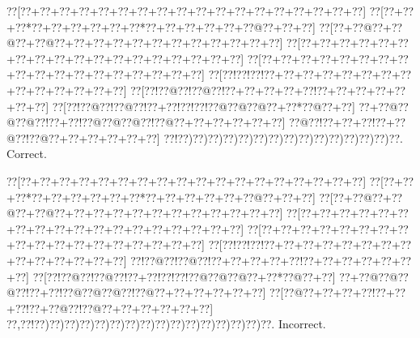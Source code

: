 \documentclass[a5paper]{article}
\begin{document}
\begin{center}
{\goo
\0??[\0??+\0??+\0??+\0??+\0??+\0??+\0??+\0??+\0??+\0??+\0??+\0??+\0??+\0??+\0??+\0??+\0??+\0??]
\0??[\0??+\0??+\0??*\0??+\0??+\0??+\0??+\0??+\0??*\0??+\0??+\0??+\0??+\0??+\0??@\0??+\0??+\0??]
\0??[\0??+\0??@\0??+\0??@\0??+\0??@\0??+\0??+\0??+\0??+\0??+\0??+\0??+\0??+\0??+\0??+\0??+\0??]
\0??[\0??+\0??+\0??+\0??+\0??+\0??+\0??+\0??+\0??+\0??+\0??+\0??+\0??+\0??+\0??+\0??+\0??+\0??]
\0??[\0??+\0??+\0??+\0??+\0??+\0??+\0??+\0??+\0??+\0??+\0??+\0??+\0??+\0??+\0??+\0??+\0??+\0??]
\0??[\0??!\0??!\0??!\0??+\0??+\0??+\0??+\0??+\0??+\0??+\0??+\0??+\0??+\0??+\0??+\0??+\0??]
\0??[\0??!\0??@\0??!\0??@\0??!\0??+\0??+\0??+\0??+\0??!\0??+\0??+\0??+\0??+\0??+\0??+\0??]
\0??[\0??!\0??@\0??!\0??@\0??!\0??+\0??!\0??!\0??!\0??@\0??@\0??@\0??+\0??*\0??@\0??+\0??]
\0??+\0??@\0??@\0??@\0??!\0??+\0??!\0??@\0??@\0??@\0??!\0??@\0??+\0??+\0??+\0??+\0??+\0??]
\0??@\0??!\0??+\0??+\0??!\0??+\0??@\0??!\0??@\0??+\0??+\0??+\0??+\0??+\0??]
\0??!\0??)\0??)\0??)\0??)\0??)\0??)\0??)\0??)\0??)\0??)\0??)\0??)\0??)\0??)\0??.
}
Correct. 

\end{center}
\begin{center}
{\goo
\0??[\0??+\0??+\0??+\0??+\0??+\0??+\0??+\0??+\0??+\0??+\0??+\0??+\0??+\0??+\0??+\0??+\0??+\0??]
\0??[\0??+\0??+\0??*\0??+\0??+\0??+\0??+\0??+\0??*\0??+\0??+\0??+\0??+\0??+\0??@\0??+\0??+\0??]
\0??[\0??+\0??@\0??+\0??@\0??+\0??@\0??+\0??+\0??+\0??+\0??+\0??+\0??+\0??+\0??+\0??+\0??+\0??]
\0??[\0??+\0??+\0??+\0??+\0??+\0??+\0??+\0??+\0??+\0??+\0??+\0??+\0??+\0??+\0??+\0??+\0??+\0??]
\0??[\0??+\0??+\0??+\0??+\0??+\0??+\0??+\0??+\0??+\0??+\0??+\0??+\0??+\0??+\0??+\0??+\0??+\0??]
\0??[\0??!\0??!\0??!\0??+\0??+\0??+\0??+\0??+\0??+\0??+\0??+\0??+\0??+\0??+\0??+\0??+\0??]
\0??!\0??@\0??!\0??@\0??!\0??+\0??+\0??+\0??+\0??!\0??+\0??+\0??+\0??+\0??+\0??+\0??]
\0??[\0??!\0??@\0??!\0??@\0??!\0??+\0??!\0??!\0??!\0??@\0??@\0??@\0??+\0??*\0??@\0??+\0??]
\0??+\0??@\0??@\0??@\0??!\0??+\0??!\0??@\0??@\0??@\0??!\0??@\0??+\0??+\0??+\0??+\0??+\0??]
\0??[\0??@\0??+\0??+\0??+\0??!\0??+\0??+\0??!\0??+\0??@\0??!\0??@\0??+\0??+\0??+\0??+\0??+\0??]
\0??,\0??!\0??)\0??)\0??)\0??)\0??)\0??)\0??)\0??)\0??)\0??)\0??)\0??)\0??)\0??)\0??)\0??.
}
Incorrect. 

\end{center}
\newpage
\end{document}

